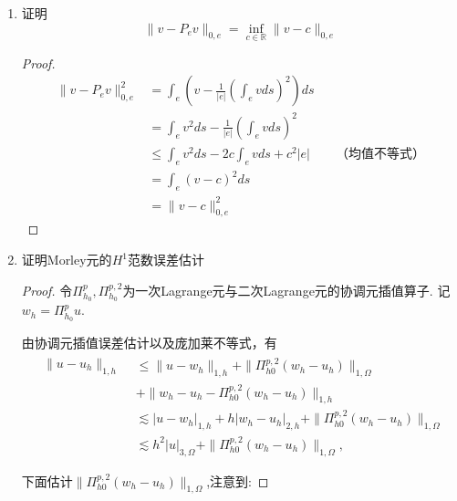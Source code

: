 \documentclass[12pt,a4paper]{article}
\begin{document}
\begin{enumerate}
\begin{proof}
			注意到最小特征值$\lambda = \frac{\pi^2}{L^2}$,进而
			
			$$\frac{\pi^2}{L^2} \|\xi\|_{0,e}^2 \leq |\xi|_{1,e}^2$$
			
		\end{proof}
		
		
		
		\item 证明
		$$\|v-P_ev\|_{0,e}=\inf_{c\in\mathbb{R}}\|v-c\|_{0,e}$$
		
		\begin{proof}
			
			$$\begin{aligned}
				\|v-P_e v\|_{0,e}^2 &= \int_e \left(v-\frac{1}{|e|}(\int_e v ds)^2\right)ds\\
				& = \int_e v^2 ds - \frac{1}{|e|}(\int_e v ds)^2\\
				& \leq \int_e v^2 ds - 2c \int_e v ds + c^2 |e| \qquad \text{（均值不等式）}\\
				& = \int_e (v-c)^2 ds\\
				& = \|v-c\|_{0,e}^2
			\end{aligned}$$
			
		\end{proof}
		
		\item 证明Morley元的$H^{1}$范数误差估计
		
		\begin{proof}
			令$\Pi_{h_0}^p,\Pi_{h_0}^{p,2}$为一次Lagrange元与二次Lagrange元的协调元插值算子. 记$w_h = \Pi_{h_0}^p u$.
			
			由协调元插值误差估计以及庞加莱不等式，有
			\begin{equation}\label{eq1}
				\begin{aligned}
					\begin{aligned}\|u-u_h\|_{1,h}\end{aligned}& \leqslant\|u-w_h\|_{1,h}+\|\Pi_{h0}^{p,2}(w_h-u_h)\|_{1,\Omega}  \\
					&+\|w_h-u_h-\Pi_{h0}^{p,2}(w_h-u_h)\|_{1,h} \\
					&\lesssim|u-w_h|_{1,h}+h|w_h-u_h|_{2,h}+\|\Pi_{h0}^{p,2}(w_h-u_h)\|_{1,\Omega} \\
					&\lesssim h^2|u|_{3,\Omega}+\|\Pi_{h0}^{p,2}(w_h-u_h)\|_{1,\Omega},
				\end{aligned}
			\end{equation}
			
			
			
			下面估计$\|\Pi_{h0}^{p,2}(w_h-u_h)\|_{1,\Omega}$,注意到:
			

\end{proof}
\end{enumerate}
\end{document}

